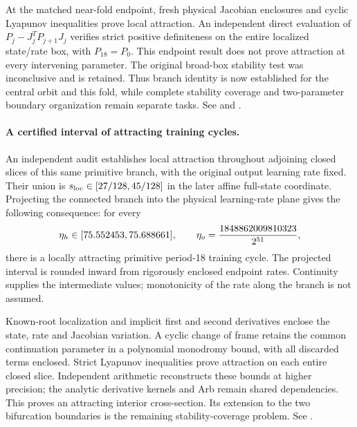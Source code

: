 \documentclass[11pt,letterpaper]{article}
\begin{document}
At the matched near-fold endpoint, fresh physical Jacobian enclosures and
\nNearFoldAttractionPhases{} cyclic Lyapunov inequalities prove local attraction.
An independent direct evaluation of $P_j-J_j^T P_{j+1}J_j$ verifies strict
positive definiteness on the entire localized state/rate box, with $P_{18}=P_0$.
This endpoint result does not prove attraction at every intervening parameter.
The original broad-box stability test was inconclusive and is retained. Thus
branch identity is now established for the central orbit and this fold, while
complete stability coverage and two-parameter boundary organization remain
separate tasks. See 
and .

\paragraph{A certified interval of attracting training cycles.}
An independent audit establishes local attraction throughout
\nWideAttractingSlices{} adjoining closed slices of this same primitive branch,
with the original output learning rate fixed. Their union is
$s_{\mathrm{loc}}\in[27/128, 45/128]$ in the later affine full-state coordinate.
Projecting the connected branch into the physical learning-rate plane gives
the following consequence: for every
\begin{equation}
\eta_h\in[75.552453, 75.688661],
\qquad \eta_o=\frac{1848862009810323}{2^{51}},
\end{equation}
there is a locally attracting primitive period-18 training cycle.
The projected interval is rounded inward from rigorously enclosed endpoint
rates. Continuity supplies the intermediate values; monotonicity of the rate
along the branch is not assumed.

Known-root localization and implicit first and second derivatives enclose the
state, rate and Jacobian variation. A cyclic change of frame retains the common
continuation parameter in a polynomial monodromy bound, with all discarded
terms enclosed. Strict Lyapunov inequalities prove attraction on each entire
closed slice. Independent arithmetic reconstructs these bounds at higher
precision; the analytic derivative kernels and Arb remain shared dependencies.
This proves an attracting interior cross-section. Its extension to the two
bifurcation boundaries is the remaining stability-coverage problem. See
.
\end{document}
